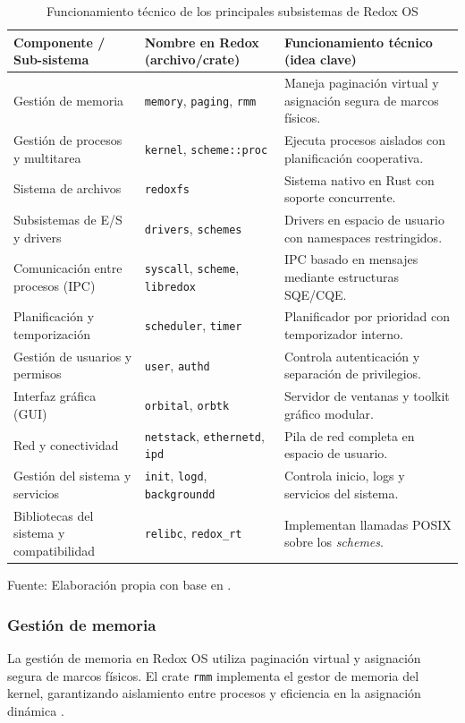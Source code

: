 \begin{table}[H]
\centering
\caption{Funcionamiento técnico de los principales subsistemas de Redox OS}
\begin{tabular}{|p{5cm}|p{4cm}|p{6cm}|}
\hline
\textbf{Componente / Sub-sistema} & \textbf{Nombre en Redox (archivo/crate)} & \textbf{Funcionamiento técnico (idea clave)} \\ \hline
Gestión de memoria & \texttt{memory}, \texttt{paging}, \texttt{rmm} & Maneja paginación virtual y asignación segura de marcos físicos. \\ \hline
Gestión de procesos y multitarea & \texttt{kernel}, \texttt{scheme::proc} & Ejecuta procesos aislados con planificación cooperativa. \\ \hline
Sistema de archivos & \texttt{redoxfs} & Sistema nativo en Rust con soporte concurrente. \\ \hline
Subsistemas de E/S y drivers & \texttt{drivers}, \texttt{schemes} & Drivers en espacio de usuario con namespaces restringidos. \\ \hline
Comunicación entre procesos (IPC) & \texttt{syscall}, \texttt{scheme}, \texttt{libredox} & IPC basado en mensajes mediante estructuras SQE/CQE. \\ \hline
Planificación y temporización & \texttt{scheduler}, \texttt{timer} & Planificador por prioridad con temporizador interno. \\ \hline
Gestión de usuarios y permisos & \texttt{user}, \texttt{authd} & Controla autenticación y separación de privilegios. \\ \hline
Interfaz gráfica (GUI) & \texttt{orbital}, \texttt{orbtk} & Servidor de ventanas y toolkit gráfico modular. \\ \hline
Red y conectividad & \texttt{netstack}, \texttt{ethernetd}, \texttt{ipd} & Pila de red completa en espacio de usuario. \\ \hline
Gestión del sistema y servicios & \texttt{init}, \texttt{logd}, \texttt{backgroundd} & Controla inicio, logs y servicios del sistema. \\ \hline
Bibliotecas del sistema y compatibilidad & \texttt{relibc}, \texttt{redox\_rt} & Implementan llamadas POSIX sobre los \textit{schemes}. \\ \hline
\end{tabular}
\centering
Fuente: Elaboración propia con base en \citep{redox_github, redox_docs}.
\end{table}


\subsubsection*{Gestión de memoria}
La gestión de memoria en Redox OS utiliza paginación virtual y asignación segura de marcos físicos. 
El crate \texttt{rmm} implementa el gestor de memoria del kernel, garantizando aislamiento entre procesos y eficiencia en la asignación dinámica \citep{osdev_memory_management}.

